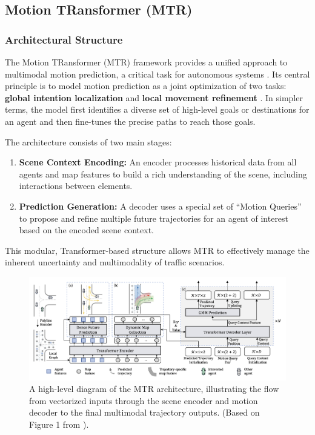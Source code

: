 \subsection{Motion TRansformer (MTR)}
\label{sec:model_mtr_architecture}

\subsubsection{Architectural Structure}
The Motion TRansformer (MTR) framework provides a unified approach to multimodal motion prediction, a critical task for autonomous systems \cite{Shi2022MTR}. Its central principle is to model motion prediction as a joint optimization of two tasks: \textbf{global intention localization} and \textbf{local movement refinement} \cite{Shi2022MTR}. In simpler terms, the model first identifies a diverse set of high-level goals or destinations for an agent and then fine-tunes the precise paths to reach those goals.

The architecture consists of two main stages:
\begin{enumerate}
    \item \textbf{Scene Context Encoding:} An encoder processes historical data from all agents and map features to build a rich understanding of the scene, including interactions between elements.
    \item \textbf{Prediction Generation:} A decoder uses a special set of ``Motion Queries'' to propose and refine multiple future trajectories for an agent of interest based on the encoded scene context.
\end{enumerate}

This modular, Transformer-based structure allows MTR to effectively manage the inherent uncertainty and multimodality of traffic scenarios.

\begin{figure}[htbp]
    \centering
    \includegraphics[width=\textwidth]{figures/mtr_overall_architecture_detail.png}
    \caption{A high-level diagram of the MTR architecture, illustrating the flow from vectorized inputs through the scene encoder and motion decoder to the final multimodal trajectory outputs. (Based on Figure 1 from \cite{Shi2022MTR}).}
    \label{fig:mtr_architecture}
\end{figure}

